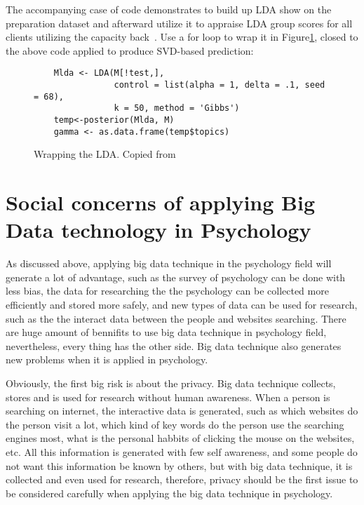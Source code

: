 The accompanying case of code demonstrates to 
build up LDA show on the preparation dataset and afterward 
utilize it to 
appraise LDA group scores for all clients utilizing the capacity 
back~\cite{hid515-12}.
Use a for loop to wrap it in Figure\ref{F:wrap}, 
closed to the above code applied to produce SVD-based prediction:

\begin{figure}[htb]
\begin{footnotesize}
\begin{verbatim}
    Mlda <- LDA(M[!test,], 
                control = list(alpha = 1, delta = .1, seed = 68),
                k = 50, method = 'Gibbs')
    temp<-posterior(Mlda, M)
    gamma <- as.data.frame(temp$topics)
\end{verbatim}
\end{footnotesize}
\caption{Wrapping the LDA. Copied from~\cite{hid515-12}}
\label{F:wrap}
\end{figure}

\section{Social concerns of applying Big Data 
technology in Psychology}

As discussed above, applying big data technique in the psychology 
field will generate a lot of advantage, such as the survey of 
psychology can be done with less bias, the data for researching the
the psychology can be collected more efficiently and stored more 
safely, and new types of data can be used for research, such as the
the interact data between the people and websites searching. 
There are huge amount of bennifits to use big data technique in 
psychology field, nevertheless, every thing has the other side. Big
data technique also generates new problems when it is applied in 
psychology. 

Obviously, the first big risk is about the privacy. Big data 
technique collects, stores and is used for research without human 
awareness. When a person is searching on internet, the interactive
data is generated, such as which websites do the person visit a 
lot, which kind of key words do the person use the searching 
engines most, what is the personal habbits of clicking the mouse on 
the websites, etc. All this information is generated with few self
awareness, and some people do not want this information be known by
others, but with big data technique, it is collected and even used 
for research, therefore, privacy should be the first issue to be 
considered carefully when applying the big data technique in 
psychology. 

